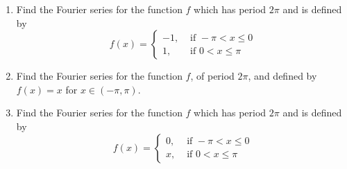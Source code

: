 \documentclass[a4paper]{amsart}
\begin{document}
\begin{enumerate}

  \item
Find the Fourier series for the function $f$ which has period $2\pi$ and is defined by 
$$ f(x)=\left\{
     \begin{array}{rl}
       -1, &  \text{ if } -\pi < x \leq 0 \\
       1, & \text{ if } 0 < x \leq \pi 
     \end{array}
   \right.$$
\item
Find the Fourier series for the function $f$, of period $2\pi$, and defined by $f(x)=x$ for $x \in (-\pi,\pi)$.
\item
Find the Fourier series for the function $f$ which has period $2\pi$ and is defined by 
$$ f(x)=\left\{
     \begin{array}{rl}
       0, &  \text{ if } -\pi < x \leq 0 \\
       x, & \text{ if } 0 < x \leq \pi 
     \end{array}
   \right.$$


\end{enumerate}
\end{document}
